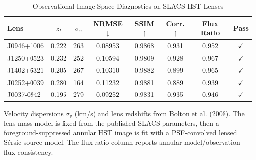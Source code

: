 \begin{table}[t]
\centering
\caption{Observational Image-Space Diagnostics on SLACS HST Lenses}
\label{tab:real_data}
\small
\begin{tabular}{l|cc|cccc|c}
\toprule
\textbf{Lens} & $z_l$ & $\sigma_v$ & \textbf{NRMSE}$\downarrow$ & \textbf{SSIM}$\uparrow$ & \textbf{Corr.}$\uparrow$ & \textbf{Flux Ratio} & \textbf{Pass} \\
\midrule
  J0946+1006 & 0.222 & 263 & 0.08953 & 0.9868 & 0.931 & 0.952 & $\checkmark$ \\
  J1250+0523 & 0.232 & 252 & 0.10594 & 0.9809 & 0.928 & 0.967 & $\checkmark$ \\
  J1402+6321 & 0.205 & 267 & 0.10310 & 0.9882 & 0.899 & 0.965 & $\checkmark$ \\
  J0252+0039 & 0.280 & 164 & 0.11232 & 0.9881 & 0.889 & 0.939 & $\checkmark$ \\
  J0037-0942 & 0.195 & 279 & 0.09252 & 0.9831 & 0.935 & 0.946 & $\checkmark$ \\
\bottomrule
\end{tabular}
\vspace{1mm}
\parbox{\columnwidth}{\footnotesize Velocity dispersions $\sigma_v$ (km/s) and lens redshifts from Bolton et al. (2008). The lens mass model is fixed from the published SLACS parameters, then a foreground-suppressed annular HST image is fit with a PSF-convolved lensed S\'ersic source model. The flux-ratio column reports annular model/observation flux consistency.}
\end{table}
